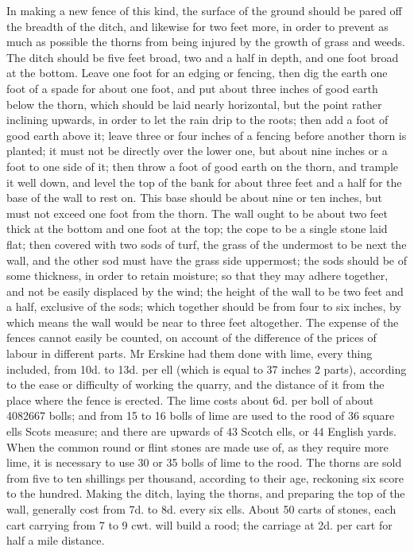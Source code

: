 \documentclass{article}
\begin{document}
In making a new fence of this kind, the surface of the ground should be pared off the breadth of the ditch, and likewise for two feet more, in order to prevent as much as possible the thorns from being injured by the growth of grass and weeds. The ditch should be five feet broad, two and a half in depth, and one foot broad at the bottom. Leave one foot for an edging or fencing, then dig the earth one foot of a spade for about one foot, and put about three inches of good earth below the thorn, which should be laid nearly horizontal, but the point rather inclining upwards, in order to let the rain drip to the roots; then add a foot of good earth above it; leave three or four inches of a fencing before another thorn is planted; it must not be directly over the lower one, but about nine inches or a foot to one side of it; then throw a foot of good earth on the thorn, and trample it well down, and level the top of the bank for about three feet and a half for the base of the wall to rest on. This base should be about nine or ten inches, but must not exceed one foot from the thorn. The wall ought to be about two feet thick at the bottom and one foot at the top; the cope to be a single stone laid flat; then covered with two sods of turf, the grass of the undermost to be next the wall, and the other sod must have the grass side uppermost; the sods should be of some thickness, in order to retain moisture; so that they may adhere together, and not be easily displaced by the wind; the height of the wall to be two feet and a half, exclusive of the sods; which together should be from four to six inches, by which means the wall would be near to three feet altogether. The expense of the fences cannot easily be counted, on account of the difference of the prices of labour in different parts. Mr Erskine had them done with lime, every thing included, from 10d. to 13d. per ell (which is equal to 37 inches 2 parts), according to the ease or difficulty of working the quarry, and the distance of it from the place where the fence is erected. The lime costs about 6d. per boll of about 4082667 bolls; and from 15 to 16 bolls of lime are used to the rood of 36 square ells Scots measure; and there are upwards of 43 Scotch ells, or 44 English yards. When the common round or flint stones are made use of, as they require more lime, it is necessary to use 30 or 35 bolls of lime to the rood. The thorns are sold from five to ten shillings per thousand, according to their age, reckoning six score to the hundred. Making the ditch, laying the thorns, and preparing the top of the wall, generally cost from 7d. to 8d. every six ells. About 50 carts of stones, each cart carrying from 7 to 9 cwt. will build a rood; the carriage at 2d. per cart for half a mile distance.
\end{document}
